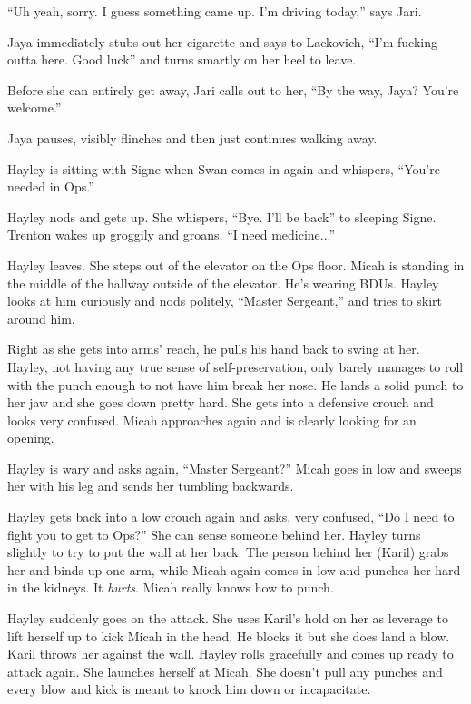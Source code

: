 ``Uh yeah, sorry.  I guess something came up.  I'm driving today,'' says Jari.

Jaya immediately stubs out her cigarette and says to Lackovich, ``I'm fucking outta here.  Good luck'' and turns smartly on her heel to leave.

Before she can entirely get away, Jari calls out to her, ``By the way, Jaya?  You're welcome.''

Jaya pauses, visibly flinches and then just continues walking away.





Hayley is sitting with Signe when Swan comes in again and whispers, ``You're needed in Ops.''

Hayley nods and gets up.  She whispers, ``Bye.  I'll be back'' to sleeping Signe.  Trenton wakes up groggily and groans, ``I need medicine...''



Hayley leaves.  She steps out of the elevator on the Ops floor.  Micah is standing in the middle of the hallway outside of the elevator.  He's wearing BDUs.  Hayley looks at him curiously and nods politely, ``Master Sergeant,'' and tries to skirt around him.



Right as she gets into arms' reach, he pulls his hand back to swing at her.  Hayley, not having any true sense of self-preservation, only barely manages to roll with the punch enough to not have him break her nose.  He lands a solid punch to her jaw and she goes down pretty hard.  She gets into a defensive crouch and looks very confused.  Micah approaches again and is clearly looking for an opening.  



Hayley is wary and asks again, ``Master Sergeant?''  Micah goes in low and sweeps her with his leg and sends her tumbling backwards.

Hayley gets back into a low crouch again and asks, very confused, ``Do I need to fight you to get to Ops?''  She can sense someone behind her.  Hayley turns slightly to try to put the wall at her back. The person behind her (Karil) grabs her and binds up one arm, while Micah again comes in low and punches her hard in the kidneys.  It \textit{hurts}.  Micah really knows how to punch.



Hayley suddenly goes on the attack.  She uses Karil's hold on her as leverage to lift herself up to kick Micah in the head.  He blocks it but she does land a blow.  Karil throws her against the wall.  Hayley rolls gracefully and comes up ready to attack again. She launches herself at Micah.  She doesn't pull any punches and every blow and kick is meant to knock him down or incapacitate.



